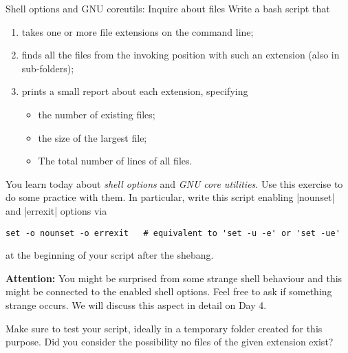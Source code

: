 
\begin{exercise}[Inspirational]{Shell options and GNU coreutils: Inquire about files}
    Write a bash script that
    \begin{enumerate}
        \item takes one or more file extensions on the command line;
        \item finds all the files from the invoking position with such an extension (also in sub-folders);
        \item prints a small report about each extension, specifying
              \begin{itemize}
                  \item the number of existing files;
                  \item the size of the largest file;
                  \item The total number of lines of all files.
              \end{itemize}
    \end{enumerate}

    You learn today about \emph{shell options} and \emph{GNU core utilities}.
    Use this exercise to do some practice with them.
    In particular, write this script enabling \bash|nounset| and \bash|errexit| options via
    \begin{lstlisting}[style=myBash]
        set -o nounset -o errexit   # equivalent to 'set -u -e' or 'set -ue'
    \end{lstlisting}
    at the beginning of your script after the shebang.

    \textbf{Attention:} You might be surprised from some strange shell behaviour and this might be connected to the enabled shell options.
    Feel free to ask if something strange occurs.
    We will discuss this aspect in detail on Day 4.

    Make sure to test your script, ideally in a temporary folder created for this purpose.
    Did you consider the possibility no files of the given extension exist?
\end{exercise}
